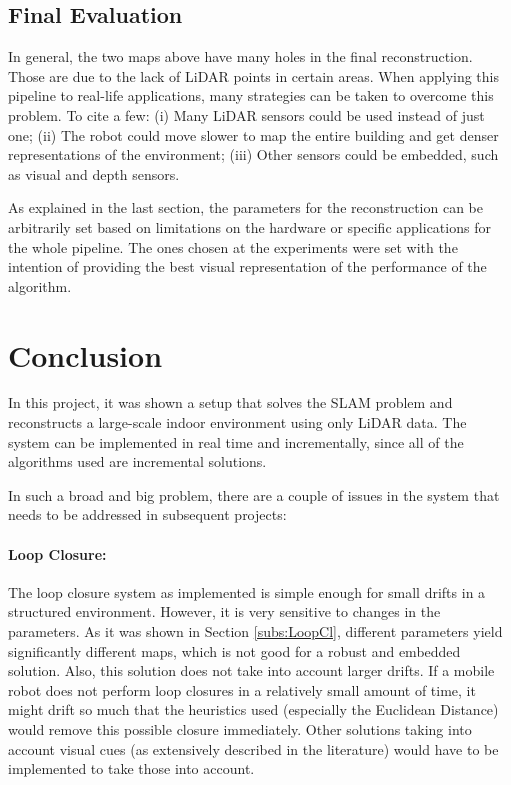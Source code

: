 \documentclass[11pt]{article}
\begin{document}
	\subsection{Final Evaluation}
	
In general, the two maps above have many holes in the final reconstruction. Those are due to the lack of LiDAR points in certain areas. When applying this pipeline to real-life applications, many strategies can be taken to overcome this problem. To cite a few: (i) Many LiDAR sensors could be used instead of just one; (ii) The robot could move slower to map the entire building and get denser representations of the environment; (iii) Other sensors could be embedded, such as visual and depth sensors.
	
As explained in the last section, the parameters for the reconstruction can be arbitrarily set based on limitations on the hardware or specific applications for the whole pipeline. The ones chosen at the experiments were set with the intention of providing the best visual representation of the performance of the algorithm.
		
	\newpage
	\section{Conclusion}
	
In this project, it was shown a setup that solves the SLAM problem and reconstructs a large-scale indoor environment using only LiDAR data. The system can be implemented in real time and incrementally, since all of the algorithms used are incremental solutions.
		
In such a broad and big problem, there are a couple of issues in the system that needs to be addressed in subsequent projects:
	
\paragraph{Loop Closure: } The loop closure system as implemented is simple enough for small drifts in a structured environment. However, it is very sensitive to changes in the parameters. As it was shown in Section \ref{subs:LoopCl}, different parameters yield significantly different maps, which is not good for a robust and embedded solution. Also, this solution does not take into account larger drifts. If a mobile robot does not perform loop closures in a relatively small amount of time, it might drift so much that the heuristics used (especially the Euclidean Distance) would remove this possible closure immediately. Other solutions taking into account visual cues (as extensively described in the literature) would have to be implemented to take those into account.
	
\end{document}
